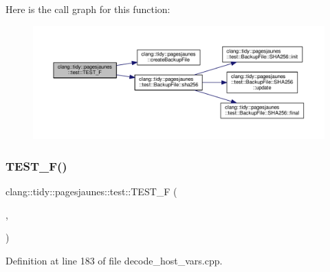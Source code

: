 Here is the call graph for this function\+:
\nopagebreak
\begin{figure}[H]
\begin{center}
\leavevmode
\includegraphics[width=350pt]{namespaceclang_1_1tidy_1_1pagesjaunes_1_1test_a99b625197cc47c5c30f4509a335dd64c_cgraph}
\end{center}
\end{figure}
\mbox{\label{namespaceclang_1_1tidy_1_1pagesjaunes_1_1test_a72cdf106c1033f23fee1e696bccbc59a}} 
\subsubsection{\texorpdfstring{T\+E\+S\+T\+\_\+\+F()}{TEST\_F()}\hspace{0.1cm}{\footnotesize\ttfamily [43/57]}}
{\footnotesize\ttfamily clang\+::tidy\+::pagesjaunes\+::test\+::\+T\+E\+S\+T\+\_\+F (\begin{DoxyParamCaption}\item[{\hyperlink{classclang_1_1tidy_1_1pagesjaunes_1_1test_1_1_decode_host_vars_test}{Decode\+Host\+Vars\+Test}}]{,  }\item[{Decode\+Host\+Vars\+Limit1}]{ }\end{DoxyParamCaption})}



Definition at line 183 of file decode\+\_\+host\+\_\+vars.\+cpp.

